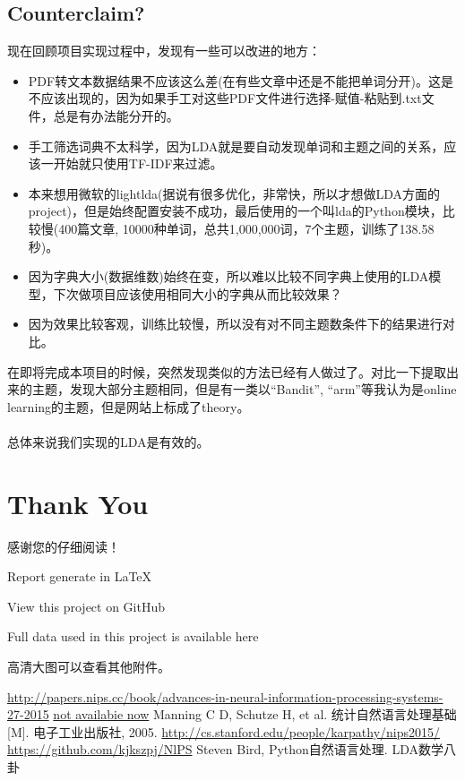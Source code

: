 \documentclass{article}
\begin{document}
\subsection{Counterclaim?}
现在回顾项目实现过程中，发现有一些可以改进的地方：
\begin{itemize}
	\item	PDF转文本数据结果不应该这么差(在有些文章中还是不能把单词分开)。这是不应该出现的，因为如果手工对这些PDF文件进行选择-赋值-粘贴到.txt文件，总是有办法能分开的。
	\item	手工筛选词典不太科学，因为LDA就是要自动发现单词和主题之间的关系，应该一开始就只使用TF-IDF来过滤。
	\item	本来想用微软的lightlda(据说有很多优化，非常快，所以才想做LDA方面的project)，但是始终配置安装不成功，最后使用的一个叫lda的Python模块，比较慢(400篇文章, 10000种单词，总共1,000,000词，7个主题，训练了138.58秒)。
	\item 因为字典大小(数据维数)始终在变，所以难以比较不同字典上使用的LDA模型，下次做项目应该使用相同大小的字典从而比较效果？
	\item	因为效果比较客观，训练比较慢，所以没有对不同主题数条件下的结果进行对比。
\end{itemize}

在即将完成本项目的时候，突然发现类似的方法已经有人做过了\cite{4}。对比一下提取出来的主题，发现大部分主题相同，但是有一类以``Bandit'', ``arm''等我认为是online learning的主题，但是网站上标成了theory。\\
~\\
总体来说我们实现的LDA是有效的。

\newpage
\section{Thank You}
\indent\indent 感谢您的仔细阅读！

Report generate in \LaTeX

View this project on GitHub\cite{5}

Full data used in this project is available here\cite{2}

高清大图可以查看其他附件。


\begin{thebibliography}{99}
 \url{http://papers.nips.cc/book/advances-in-neural-information-processing-systems-27-2015}
 \url{not availabie now}
 Manning C D, Schutze H, et al. 统计自然语言处理基础[M]. 电子工业出版社, 2005.
 \url{http://cs.stanford.edu/people/karpathy/nips2015/}
 \url{https://github.com/kjkszpj/NlPS}
 Steven Bird, Python自然语言处理.
 LDA数学八卦
\end{thebibliography}
\end{document}
